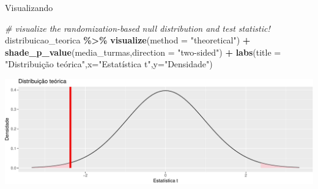 \documentclass[
  9pt,
  ignorenonframetext,
  aspectratio=169]{beamer}
\newenvironment{Shaded}{\begin{snugshade}}{\end{snugshade}}
\newcommand{\CommentTok}[1]{\textcolor[rgb]{0.56,0.35,0.01}{\textit{#1}}}
\newcommand{\DataTypeTok}[1]{\textcolor[rgb]{0.13,0.29,0.53}{#1}}
\newcommand{\KeywordTok}[1]{\textcolor[rgb]{0.13,0.29,0.53}{\textbf{#1}}}
\newcommand{\NormalTok}[1]{#1}
\newcommand{\OperatorTok}[1]{\textcolor[rgb]{0.81,0.36,0.00}{\textbf{#1}}}
\newcommand{\StringTok}[1]{\textcolor[rgb]{0.31,0.60,0.02}{#1}}
\begin{document}
\begin{frame}[fragile]{Visualizando}
\protect\hypertarget{visualizando}{}
\begin{Shaded}
\begin{Highlighting}[]
\CommentTok{\# visualize the randomization{-}based null distribution and test statistic!}
\NormalTok{distribuicao\_teorica }\OperatorTok{\%\textgreater{}\%}
\StringTok{  }\KeywordTok{visualize}\NormalTok{(}\DataTypeTok{method =} \StringTok{"theoretical"}\NormalTok{) }\OperatorTok{+}\StringTok{ }
\StringTok{  }\KeywordTok{shade\_p\_value}\NormalTok{(media\_turmas,}\DataTypeTok{direction =} \StringTok{"two{-}sided"}\NormalTok{) }\OperatorTok{+}\StringTok{ }
\StringTok{  }\KeywordTok{labs}\NormalTok{(}\DataTypeTok{title =} \StringTok{"Distribuição teórica"}\NormalTok{,}\DataTypeTok{x=}\StringTok{"Estatística t"}\NormalTok{,}\DataTypeTok{y=}\StringTok{"Densidade"}\NormalTok{)}
\end{Highlighting}
\end{Shaded}

\includegraphics{aula_11_files/figure-beamer/unnamed-chunk-8-1.pdf}
\end{frame}
\end{document}
